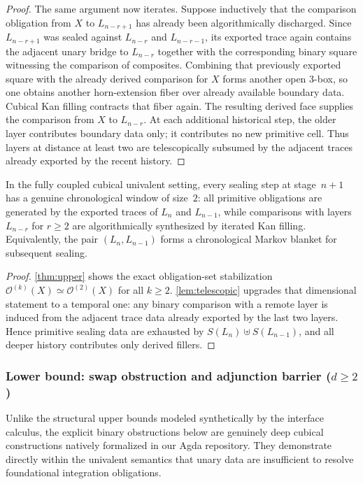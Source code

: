 \documentclass{lmcs}
\newcommand{\Ocal}{\mathcal{O}}
\begin{document}
\begin{proof}
The same argument now iterates. Suppose inductively that the comparison obligation from $X$ to $L_{n-r+1}$ has already been algorithmically discharged. Since $L_{n-r+1}$ was sealed against $L_{n-r}$ and $L_{n-r-1}$, its exported trace again contains the adjacent unary bridge to $L_{n-r}$ together with the corresponding binary square witnessing the comparison of composites. Combining that previously exported square with the already derived comparison for $X$ forms another open $3$-box, so one obtains another horn-extension fiber over already available boundary data. Cubical Kan filling contracts that fiber again. The resulting derived face supplies the comparison from $X$ to $L_{n-r}$. At each additional historical step, the older layer contributes boundary data only; it contributes no new primitive cell. Thus layers at distance at least two are telescopically subsumed by the adjacent traces already exported by the recent history.
\end{proof}

\begin{cor}
\label{cor:chrono-window}
In the fully coupled cubical univalent setting, every sealing step at stage~$n+1$ has a genuine chronological window of size~$2$: all primitive obligations are generated by the exported traces of $L_n$ and $L_{n-1}$, while comparisons with layers $L_{n-r}$ for $r \geq 2$ are algorithmically synthesized by iterated Kan filling. Equivalently, the pair $(L_n,L_{n-1})$ forms a chronological Markov blanket for subsequent sealing.
\end{cor}

\begin{proof}
\autoref{thm:upper} shows the exact obligation-set stabilization $\Ocal^{(k)}(X) \simeq \Ocal^{(2)}(X)$ for all $k \geq 2$. \autoref{lem:telescopic} upgrades that dimensional statement to a temporal one: any binary comparison with a remote layer is induced from the adjacent trace data already exported by the last two layers. Hence primitive sealing data are exhausted by $S(L_n)\uplus S(L_{n-1})$, and all deeper history contributes only derived fillers.
\end{proof}

\subsubsection{\texorpdfstring{Lower bound: swap obstruction and adjunction barrier ($d \geq 2$)}{Lower bound}}

\begin{rem}
Unlike the structural upper bounds modeled synthetically by the interface calculus, the explicit binary obstructions below are genuinely deep cubical constructions natively formalized in our Agda repository. They demonstrate directly within the univalent semantics that unary data are insufficient to resolve foundational integration obligations.
\end{rem}
\end{document}
